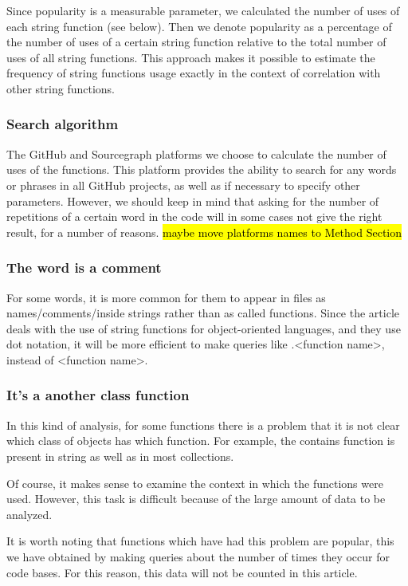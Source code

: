 \documentclass[anonymous,sigplan,review,11pt,nonacm,natbib=false]{acmart}
\begin{document}
    Since popularity is a measurable parameter, we calculated the number of uses of each string function (see below). Then we denote popularity as a percentage of the number of uses of a certain string function relative to the total number of uses of all string functions. This approach makes it possible to estimate the frequency of string functions usage exactly in the context of correlation with other string functions.

    \subsubsection{Search algorithm}

    The GitHub and Sourcegraph platforms we choose to calculate the number of uses of the functions. This platform provides the ability to search for any words or phrases in all GitHub projects, as well as if necessary to specify other parameters. However, we should keep in mind that asking for the number of repetitions of a certain word in the code will in some cases not give the right result, for a number of reasons. \hl{maybe move platforms names to Method Section}

    \subsubsection{The word is a comment}

    For some words, it is more common for them to appear in files as names/comments/inside strings rather than as called functions. Since the article deals with the use of string functions for object-oriented languages, and they use dot notation, it will be more efficient to make queries like .<function name>, instead of <function name>.

    \subsubsection{It's a another class function}

    In this kind of analysis, for some functions there is a problem that it is not clear which class of objects has which function. For example, the contains function is present in string as well as in most collections.

    Of course, it makes sense to examine the context in which the functions were used. However, this task is difficult because of the large amount of data to be analyzed.

    It is worth noting that functions which have had this problem are popular, this we have obtained by making queries about the number of times they occur for code bases. For this reason, this data will not be counted in this article.
\end{document}
